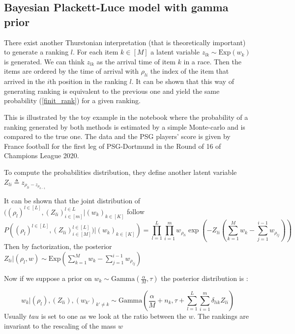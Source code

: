 \documentclass{article}
\begin{document}
\subsection{Bayesian Plackett-Luce model with gamma prior}

There exist another Thurstonian interpretation (that is theoretically important) to generate a ranking $l$. 
For each item $k \in [M]$ a latent variable $z_{lk} \sim \text{Exp}(w_k)$ is generated. We can think $z_{lk}$ as the arrival time of item $k$ in a race. Then the items are ordered by the time of arrival with $\rho_{li}$ the index of the item that arrived in the $i$th position in the ranking $l$.
It can be shown that this way of generating ranking is equivalent to the previous one and yield the same probability (\ref{finit_rank}) for a given ranking. 

This is illustrated by the toy example in the notebook where the probability of a ranking generated by both methods is estimated by a simple Monte-carlo and is compared to the true one. The data and the PSG players' score is given by France football for the first leg of PSG-Dortmund in the Round of 16 of Champions League 2020.

To compute the probabilities distribution, they define another latent variable $Z_{li} \triangleq z_{\rho_{li} -z_{\rho_{li-1} }}$

It can be shown that the joint distribution of $((\rho_l)^{l\in [L]},(Z_{li})_{i \in [m] }^{l \in L}| (w_k)_{k\in[K]}$ follow
\begin{equation}
    P\left( (\rho_l)^{l\in [L]},(Z_{li})_{i \in [M] }^{l \in [L]} ) \vert (w_k)_{k\in[K]} \right) = \prod_{l=1}^L\prod_{i=1}^m w_{\rho_{li}} \exp \left( -Z_{li}\left(\sum_{k=1}^M w_k-\sum_{j=1}^{i-1} w_{\rho_{lj}} \right) \right)
    \label{jointfinit}
\end{equation}
Then by factorization, the posterior $Z_{li}\vert (\rho_l,w) \sim \text{Exp}\left(\sum_{k=1}^M w_k-\sum_{j=1}^{i-1} w_{\rho_{lj}} \right)$

Now if we suppose a prior on $w_k\sim\text{Gamma}\left(\frac{\alpha}{M},\tau\right)$ the posterior distribution is : 

\begin{equation}
w_k\vert (\rho_l),(Z_{li}),(w_{k'})_{k'\neq k} \sim \text{Gamma}\left(\frac{\alpha}{M}+n_k,\tau +\sum_{l=1}^L\sum_{i=1}^m \delta_{lik}Z_{li}\right)
\label{wfinit}
\end{equation}
Usually $tau$ is set to one as we look at the ratio between the $w$. The rankings are invariant to the rescaling of the mass $w$
\end{document}
